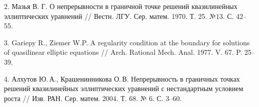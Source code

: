 
2. Мазья В. Г. О непрерывности в граничной точке решений квазилинейных эллиптических
уравнений // Вестн. ЛГУ. Сер. матем. 1970. Т. 25. №13. С. 42--55.


3. Gariepy R., Ziemer W.P. A regularity condition at the boundary for solutions of quasilinear
elliptic equations // Arch. Rational Mech. Anal. 1977. V. 67. P. 25--39.


4. Алхутов Ю.\,А., Крашенинникова О.\,В.
Непрерывность в граничных точках решений квазилинейных эл\-ли\-п\-ти\-че\-с\-ких уравнений с нестандартным условием роста
//
Изв.
\linebreak
РАН. Сер. матем. 2004. Т. 68. № 6. С. 3–60.
